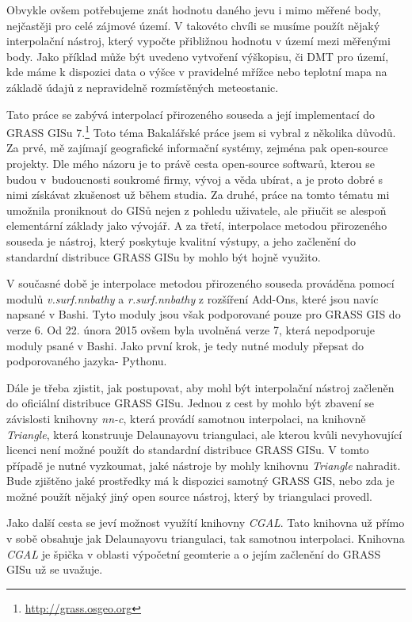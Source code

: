 \documentclass[12pt,a4paper]{article}
\begin{document}
Obvykle ovšem potřebujeme znát hodnotu daného jevu i mimo měřené body, nejčastěji pro celé zájmové území. V takovéto chvíli se musíme použít nějaký interpolační nástroj, který vypočte přibližnou hodnotu v území mezi měřenými body. Jako příklad může být uvedeno vytvoření výškopisu, či DMT pro území, kde máme k dispozici data o výšce v pravidelné mřížce nebo teplotní mapa na základě údajů z nepravidelně rozmístěných meteostanic.

\bigskip
Tato práce se zabývá interpolací přirozeného souseda a její implementací do GRASS GISu 7.\footnote{\url{http://grass.osgeo.org}} Toto téma Bakalářské práce jsem si vybral z několika důvodů. Za prvé, mě zajímají geografické informační systémy, zejména pak open-source projekty. Dle mého názoru je to právě cesta open-source softwarů, kterou se budou v~budoucnosti soukromé firmy, vývoj a věda ubírat, a je proto dobré s nimi získávat zkušenost už během studia. Za druhé, práce na tomto tématu mi umožnila proniknout do GISů nejen z pohledu uživatele, ale přiučit se alespoň elementární základy jako vývojář. A za třetí, interpolace metodou přirozeného souseda je nástroj, který poskytuje kvalitní výstupy, a jeho začlenění do standardní distribuce GRASS GISu by mohlo být hojně využito.

V současné době je interpolace metodou přirozeného souseda prováděna pomocí modulů \emph{v.surf.nnbathy} a \emph{r.surf.nnbathy} z rozšíření Add-Ons, které jsou navíc napsané v Bashi. Tyto moduly jsou však podporované pouze pro GRASS GIS do verze 6. Od 22. února 2015 ovšem byla uvolněná verze 7, která nepodporuje moduly psané v Bashi. Jako první krok, je tedy nutné moduly přepsat do podporovaného jazyka- Pythonu. 

\newpage
Dále je třeba zjistit, jak postupovat, aby mohl být interpolační nástroj začleněn do oficiální distribuce GRASS GISu. Jednou z cest by mohlo být zbavení se závislosti knihovny \emph{nn-c}, která provádí samotnou interpolaci, na knihovně \emph{Triangle}, která konstruuje Delaunayovu triangulaci, ale kterou kvůli nevyhovující licenci není možné použít do standardní distribuce GRASS GISu. V tomto případě je nutné vyzkoumat, jaké nástroje by mohly knihovnu \emph{Triangle} nahradit. Bude zjištěno jaké prostředky má k dispozici samotný GRASS GIS, nebo zda je možné použít nějaký jiný open source nástroj, který by triangulaci provedl.

Jako další cesta se jeví možnost využítí knihovny \emph{CGAL}. Tato knihovna už přímo v sobě obsahuje jak Delaunayovu triangulaci, tak samotnou interpolaci. Knihovna \emph{CGAL} je špička v oblasti výpočetní geomterie a o jejím začlenění do GRASS GISu už se uvažuje.
\end{document}
